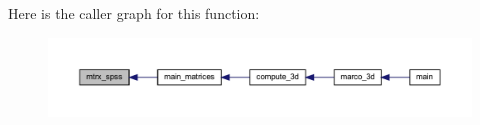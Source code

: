 Here is the caller graph for this function\+:
\nopagebreak
\begin{figure}[H]
\begin{center}
\leavevmode
\includegraphics[width=350pt]{Marco_8f90_a9b8cd7f2e81c5d270b9963c9f3f80f67_icgraph}
\end{center}
\end{figure}
\mbox{\label{Marco_8f90_afcb6780579e2ba238d661f0c3425dde9}} 
